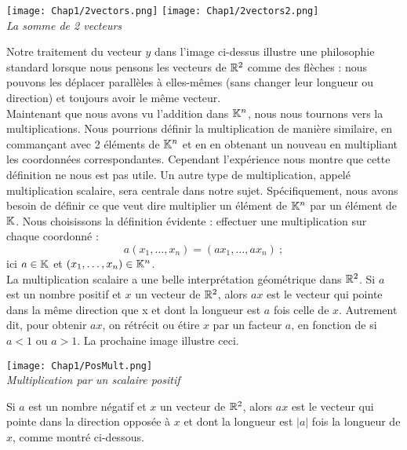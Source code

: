 \documentclass[12pt]{book}
\theoremstyle{plain}
\begin{document}
 

\begin{center}
    \texttt{[image: Chap1/2vectors.png]}
    \hspace{1cm}
    \texttt{[image: Chap1/2vectors2.png]}\\
    \textit{La somme de 2 vecteurs}
\end{center}

Notre traitement du vecteur $y$ dans l'image ci-dessus illustre une philosophie standard lorsque nous pensons les vecteurs de $\mathbb{R}^2$ comme des flèches : nous pouvons les déplacer parallèles à elles-mêmes (sans changer leur longueur ou direction) et toujours avoir le même vecteur.\\
\indent
Maintenant que nous avons vu l'addition dans $\mathbb{K}^n$, nous nous tournons vers la multiplications. Nous pourrions définir la multiplication de manière similaire, en commançant avec 2 éléments de $\mathbb{K}^n$ et en en obtenant un nouveau en multipliant les coordonnées correspondantes. Cependant l'expérience nous montre que cette définition ne nous est pas utile. Un autre type de multiplication, appelé multiplication scalaire, sera centrale dans notre sujet. Spécifiquement, nous avons besoin de définir ce que veut dire multiplier un élément de $\mathbb{K}^n$ par un élément de $\mathbb{K}$. Nous choisissons la définition évidente : effectuer une multiplication sur chaque coordonné :
\begin{equation*}
    a(x_1,\ldots,x_n)=(ax_1,\ldots,ax_n)~;
\end{equation*}
ici $a\in\mathbb{K}$ et $(x_1,\ldots,x_n)\in\mathbb{K}^n$.\\
\indent
La multiplication scalaire a une belle interprétation géométrique dans $\mathbb{R}^2$. Si $a$ est un nombre positif et $x$ un vecteur de $\mathbb{R}^2$, alors $ax$ est le vecteur qui pointe dans la même direction que x et dont la longueur est $a$ fois celle de $x$. Autrement dit, pour obtenir $ax$, on rétrécit ou étire $x$ par un facteur $a$, en fonction de si $a<1$ ou $a>1$. La prochaine image illustre ceci.

\begin{center}
    \texttt{[image: Chap1/PosMult.png]}\\
    \textit{Multiplication par un scalaire positif}
\end{center}

\noindent
Si $a$ est un nombre négatif et $x$ un vecteur de $\mathbb{R}^2$, alors $ax$ est le vecteur qui pointe dans la direction opposée à $x$ et dont la longueur est $|a|$ fois la longueur de $x$, comme montré ci-dessous.
\end{document}
